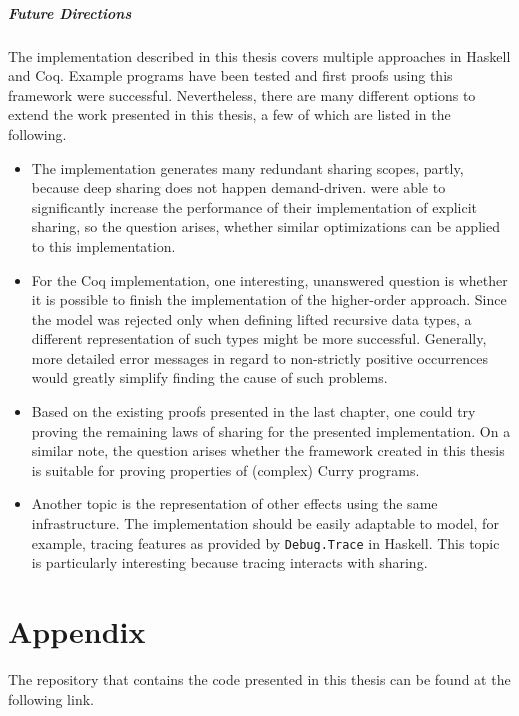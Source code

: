 \documentclass[a4paper, 11pt, fleqn, twoside, abstract=on]{scrreprt}
\newcommand{\hinl}[1]{\texttt{#1}}
\begin{document}
\paragraph{Future Directions}
The implementation described in this thesis covers multiple approaches in Haskell and Coq.
Example programs have been tested and first proofs using this framework were successful.
Nevertheless, there are many different options to extend the work presented in this thesis,
a few of which are listed in the following.
\begin{itemize}
\item The implementation generates many redundant sharing scopes, partly, because deep sharing does not happen demand-driven.
      \citet{fischer2009purely} were able to significantly increase the performance of their implementation of explicit sharing, so the question arises, whether similar optimizations can be applied to this implementation.
\item For the Coq implementation, one interesting, unanswered question is whether it is possible to finish the implementation of the higher-order approach.
      Since the model was rejected only when defining lifted recursive data types, a different representation of such types might be more successful.
      Generally, more detailed error messages in regard to non-strictly positive occurrences would greatly simplify finding the cause of such problems.
\item Based on the existing proofs presented in the last chapter, one could try proving the remaining laws of sharing for the presented implementation. On a similar note, the question arises whether the framework created in this thesis is suitable for proving properties of (complex) Curry programs.
\item Another topic is the representation of other effects using the same infrastructure.
      The implementation should be easily adaptable to model, for example, tracing features as provided by \hinl{Debug.Trace} in Haskell.
      This topic is particularly interesting because tracing interacts with sharing.
\end{itemize}







\appendix
\chapter{Appendix}
The repository that contains the code presented in this thesis can be found at the following link.
\end{document}
